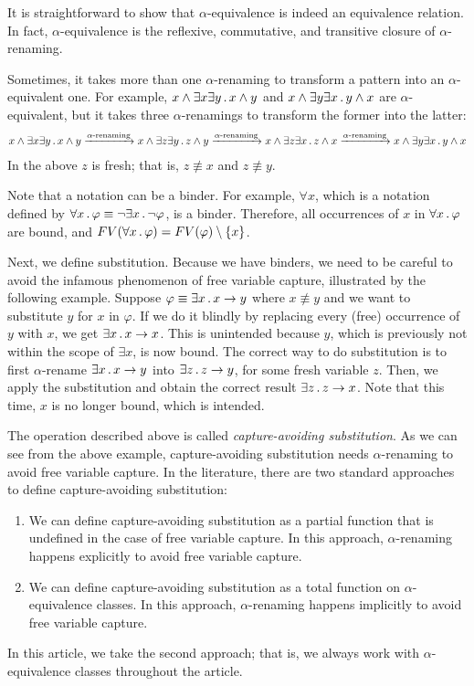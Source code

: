 \documentclass{article}
\begin{document}
It is straightforward to show that $\alpha$-equivalence
is indeed an equivalence relation.
In fact, $\alpha$-equivalence is the reflexive, commutative, and transitive
closure of $\alpha$-renaming.

Sometimes, it takes more than one $\alpha$-renaming to transform
a pattern into an $\alpha$-equivalent one.
For example, $x \land \exists x \exists y \,.\, x \land y$
and $x \land \exists y \exists x \,.\, y \land x$ are $\alpha$-equivalent,
but it takes three $\alpha$-renamings to transform the former into the latter:
\begin{align}
x \land \exists x \exists y \,.\, x \land y
\xrightarrow{\text{$\alpha$-renaming}}
x \land \exists z \exists y \,.\, z \land y
\xrightarrow{\text{$\alpha$-renaming}}
x \land \exists z \exists x \,.\, z \land x
\xrightarrow{\text{$\alpha$-renaming}}
x \land \exists y \exists x \,.\, y \land x
\end{align}
In the above $z$ is fresh; that is, $z \not\equiv x$ and $z \not\equiv y$.

Note that a notation can be a binder.
For example, $\forall x$, which is a notation defined by
$\forall x \,.\, \varphi \equiv \neg \exists x \,.\, \neg \varphi$,
is a binder.
Therefore, all occurrences of $x$ in $\forall x \,.\, \varphi$ are bound,
and $FV(\forall x \,.\, \varphi) = FV(\varphi) \setminus \{x\}$.

Next, we define substitution.
Because we have binders, we need to be careful to avoid the
infamous phenomenon of free variable capture,
illustrated by the following example.
Suppose $\varphi \equiv \exists x \,.\, x \to y$
where $x \not\equiv y$
and we want to substitute $y$ for $x$ in $\varphi$.
If we do it blindly by replacing every (free) occurrence of $y$ with $x$,
we get
$\exists x \,.\, x \to x$.
This is unintended because $y$, which is previously not within the scope of $\exists x$, is now bound.
The correct way to do substitution
is to first $\alpha$-rename
$\exists x \,.\, x \to y$ into $\exists z \,.\, z \to y$, for some fresh variable $z$.
Then, we apply the substitution and obtain the correct result
$\exists z \,.\, z \to x$.
Note that this time, $x$ is no longer bound, which is intended.

The operation described above is called \emph{capture-avoiding substitution}.
As we can see from the above example, capture-avoiding substitution needs
$\alpha$-renaming to avoid free variable capture.
In the literature, there are two standard
approaches to define capture-avoiding substitution:
\begin{enumerate}
\item We can define capture-avoiding substitution as a partial function
      that is undefined in the case of free variable capture.
      In this approach, $\alpha$-renaming happens explicitly to avoid free variable capture.
\item We can define capture-avoiding substitution as a total function
      on $\alpha$-equivalence classes. In this approach, $\alpha$-renaming
      happens implicitly to avoid free variable capture.
\end{enumerate}
In this article, we take the second approach;
that is, we always work with $\alpha$-equivalence classes
throughout the article.
\end{document}
